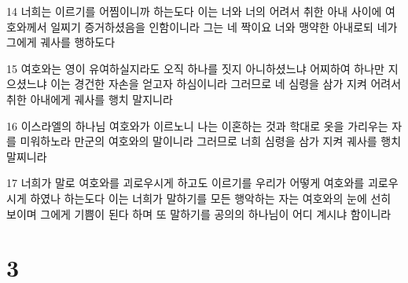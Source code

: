 \par 14 너희는 이르기를 어찜이니까 하는도다 이는 너와 너의 어려서 취한 아내 사이에 여호와께서 일찌기 증거하셨음을 인함이니라 그는 네 짝이요 너와 맹약한 아내로되 네가 그에게 궤사를 행하도다
\par 15 여호와는 영이 유여하실지라도 오직 하나를 짓지 아니하셨느냐 어찌하여 하나만 지으셨느냐 이는 경건한 자손을 얻고자 하심이니라 그러므로 네 심령을 삼가 지켜 어려서 취한 아내에게 궤사를 행치 말지니라
\par 16 이스라엘의 하나님 여호와가 이르노니 나는 이혼하는 것과 학대로 옷을 가리우는 자를 미워하노라 만군의 여호와의 말이니라 그러므로 너희 심령을 삼가 지켜 궤사를 행치 말찌니라
\par 17 너희가 말로 여호와를 괴로우시게 하고도 이르기를 우리가 어떻게 여호와를 괴로우시게 하였나 하는도다 이는 너희가 말하기를 모든 행악하는 자는 여호와의 눈에 선히 보이며 그에게 기쁨이 된다 하며 또 말하기를 공의의 하나님이 어디 계시냐 함이니라

\chapter{3}

